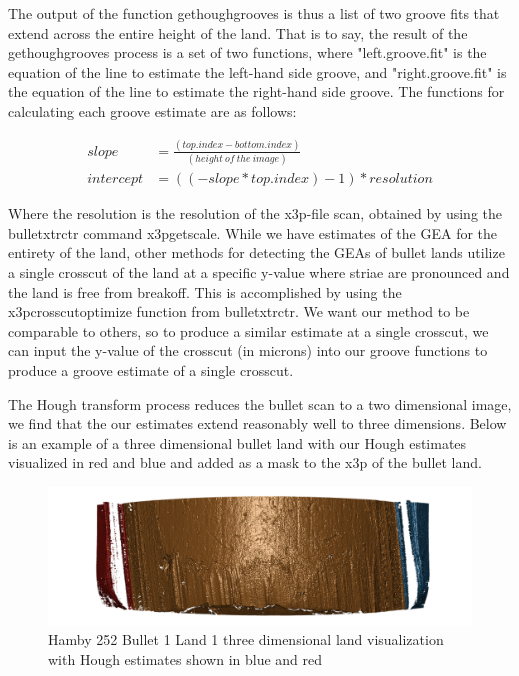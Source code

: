 \documentclass[12pt]{article}
\theoremstyle{nonumberplain}
\begin{document}
The output of the function get\textunderscore hough\textunderscore grooves is thus a list of two groove fits that extend across the entire height of the land. That is to say, the result of the get\textunderscore hough\textunderscore grooves process is a set of two functions, where "left.groove.fit" is the equation of the line to estimate the left-hand side groove, and "right.groove.fit" is the equation of the line to estimate the right-hand side groove. The functions for calculating each groove estimate are as follows:

\begin{align}
slope &= \frac{(top.index - bottom.index)}{(height \ of \ the \ image)} \\
intercept &= ((- slope * top.index) - 1 ) * resolution
\end{align}

Where the resolution is the resolution of the x3p-file scan, obtained by using the bulletxtrctr command x3p\textunderscore get\textunderscore scale. While we have estimates of the GEA for the entirety of the land, other methods for detecting the GEAs of bullet lands utilize a single crosscut of the land at a specific y-value where striae are pronounced and the land is free from breakoff. This is accomplished by using the x3p\textunderscore crosscut\textunderscore optimize function from bulletxtrctr. We want our method to be comparable to others, so to produce a similar estimate at a single crosscut, we can input the y-value of the crosscut (in microns) into our groove functions to produce a groove estimate of a single crosscut. 


The Hough transform process reduces the bullet scan to a two dimensional image, we find that the our estimates extend reasonably well to three dimensions. Below is an example of a three dimensional bullet land with our Hough estimates visualized in red and blue and added as a mask to the x3p of the bullet land.

\begin{figure}[!ht]
  \centering
  \includegraphics[width = .7\textwidth]{../images/Hamby252_Bullet1_Land1_GoodMask}
  \caption{Hamby 252 Bullet 1 Land 1 three dimensional land visualization with Hough estimates shown in blue and red}
\end{figure}
\newpage
\end{document}
